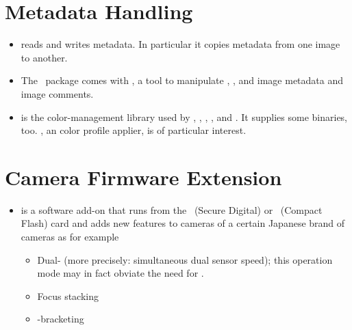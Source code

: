 \section[Metadata Handling]{\label{sec:metadata-handling}%
  Metadata Handling}

\begin{itemize}
  \label{app:exiftool}%
\item
   reads and writes  metadata.  In
  particular it copies metadata from one image to another.

  \label{app:exivii}%
\item
  The ~package comes with , a tool to manipulate
  , , and  image metadata and image comments.

  \label{app:littlecms}%
\item
   is the color-management library used by ,
  , , \App, and \OtherApp.  It supplies some binaries,
  too.  , an  color profile applier, is of particular interest.
\end{itemize}


\section[Camera Firmware Extension]{\label{sec:camera-firmware-extension}%
  Camera Firmware Extension}

\begin{itemize}
  \label{app:magiclantern}%
\item
   is a software add-on that runs from the
  ~(Secure Digital) or ~(Compact Flash) card and adds new features to
  cameras of a certain Japanese brand of cameras as for example

  \begin{itemize}
  \item
    Dual- (more precisely: simultaneous dual sensor speed); this operation mode may
    in fact obviate the need for .

  \item
    Focus stacking

  \item
    -bracketing
  \end{itemize}
\end{itemize}



